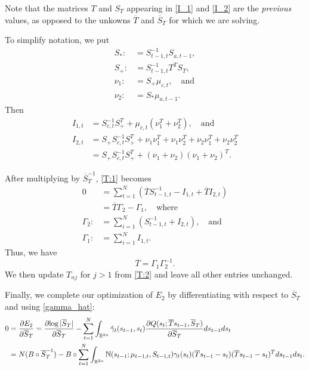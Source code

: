 \documentclass[12pt,leqno]{article}
\begin{document}
Note that the matrices $T$ and $S_T$ appearing in \eqref{I_1} and \eqref{I_2} are the {\em previous}
values, as opposed to the unkowns $\overline{T}$ and $\overline{S}_T$ for which we are solving.

To simplify notation, we put
\begin{align*}
S_* :&= S_{t-1,t}^{-1}S_{a,t-1},\\
S_+ :&= S_{t-1,t}^{-1}T^TS_T,\\
\nu_1 :&= S_+\mu_{c,t},\quad\text{and}\\
\nu_2 :&= S_*\mu_{a,t-1}.
\end{align*}
Then
\begin{align*}
  I_{1,t} &= S_{c,t}^{-1}S_+^T +\mu_{c,t}(\nu_1^T + \nu_2^T), \quad\text{and}\\
  I_{2,t} &= S_+S_{c,t}^{-1}S_+^T+\nu_1\nu_1^T + \nu_1\nu_2^T + \nu_2\nu_1^T + \nu_2\nu_2^T \\
      &= S_+S_{c,t}^{-1}S_+^T + (\nu_1+\nu_2)(\nu_1+\nu_2)^T.
\end{align*}

After multiplying by $\overline{S}_T^{-1}$, \eqref{T:1} becomes
\begin{align*}
 0 &= \sum_{t=1}^N\left(\overline{T}S_{t-1,t}^{-1} - I_{1,t} + \overline{T}I_{2,t}\right)\\
  &= \overline{T}\Gamma_2 - \Gamma_1, \quad\text{where} \\
  \Gamma_2 :&= \sum_{i=1}^N(S_{t-1,t}^{-1} + I_{2,t}),\quad\text{and}\\
  \Gamma_1 :&= \sum_{i=1}^NI_{1,t}.
\end{align*}
Thus,  we have
\begin{equation}\label{T:2}
  \overline{T} = \Gamma_1\Gamma_2^{-1}.
\end{equation}
We then update $T_{nj}$ for $j > 1$ from \eqref{T:2} and leave all other entries unchanged.

Finally, we complete our optimization of $E_2$ by differentiating with respect to $\overline{S}_T$ and using \eqref{gamma_hat}:
\begin{equation}\label{Sigma_Tr:0}
  \begin{split}
  0 &= \frac{\partial{E_2}}{\partial{\overline{S}_T}} = \frac{\partial{\log|\overline{S}_T|}}{\partial\overline{S}_T}
  - \sum_{t=1}^N\int_{{\mathbb R}^{2n}}\hat{\gamma}_t(s_{t-1},s_t)\frac{\partial{Q(s_t;\overline{T}s_{t-1},\overline{S}_T)}}
  {\partial\overline{S}_T}ds_{t-1}ds_t \\
  &= N(B\circ\overline{S}_T^{-1}) -B\circ\sum_{t=1}^N\int_{{\mathbb R}^{2n}}{\mathbb N}(s_{t-1};\mu_{t-1,t},S_{t-1,t})
  \gamma_t(s_t)(\overline{T}s_{t-1}-s_t)(\overline{T}s_{t-1}-s_t)^Tds_{t-1}ds_t.
  \end{split}
\end{equation}
\end{document}
